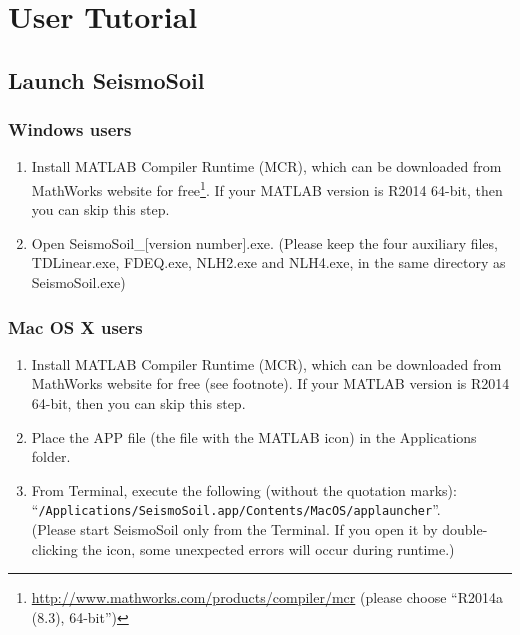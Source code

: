 \documentclass[11pt,letterpaper]{article}
\begin{document}
\section{User Tutorial}
\subsection{Launch SeismoSoil}

\subsubsection{Windows users}

\begin{enumerate}
	\item Install MATLAB Compiler Runtime (MCR), which can be downloaded from MathWorks website for free\footnote{\href{http://www.mathworks.com/products/compiler/mcr}{\textsf{http://www.mathworks.com/products/compiler/mcr}} (please choose ``R2014a (8.3), 64-bit'')}. If your MATLAB version is R2014 64-bit, then you can skip this step.
	
	\item Open {\textsf{{SeismoSoil\_[version number].exe}}}. (Please keep the four auxiliary files, {\textsf{TDLinear.exe}}, {\textsf{FDEQ.exe}}, {\textsf{NLH2.exe}} and {\textsf{NLH4.exe}}, in the same directory as {\textsf{{SeismoSoil.exe}}})
\end{enumerate}

\subsubsection{Mac OS X users}

\begin{enumerate}
	\item Install MATLAB Compiler Runtime (MCR), which can be downloaded from MathWorks website for free (see footnote). If your MATLAB version is R2014 64-bit, then you can skip this step.
	
	\item Place the APP file (the file with the MATLAB icon) in the Applications folder.
	\item From Terminal, execute the following (without the quotation marks):\\
	 ``\texttt{/Applications/SeismoSoil.app/Contents/MacOS/applauncher}''. \\(Please start SeismoSoil only from the Terminal. If you open it by double-clicking the icon, some unexpected errors will occur during runtime.)
\end{enumerate}
\end{document}
